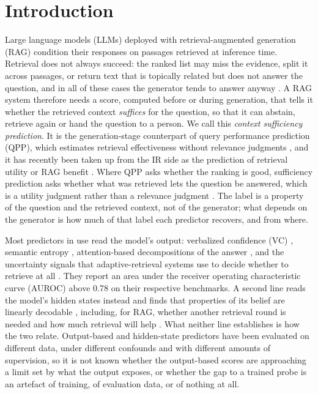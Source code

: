 \documentclass[acmsmall,screen,review]{acmart}
\begin{document}
\maketitle

\section{Introduction}
\label{sec:introduction}

Large language models (LLMs) deployed with retrieval-augmented generation (RAG) \citep{lewis2020rag} condition their responses on passages retrieved at inference time. Retrieval does not always succeed: the ranked list may miss the evidence, split it across passages, or return text that is topically related but does not answer the question, and in all of these cases the generator tends to answer anyway \citep{joren2025sufficient,cuconasu2024power}. A RAG system therefore needs a score, computed before or during generation, that tells it whether the retrieved context \emph{suffices} for the question, so that it can abstain, retrieve again or hand the question to a person. We call this \emph{context sufficiency prediction}. It is the generation-stage counterpart of query performance prediction (QPP), which estimates retrieval effectiveness without relevance judgments \citep{cronentownsend2002predicting,shtok2012predicting,carmel2010estimating}, and it has recently been taken up from the IR side as the prediction of retrieval utility or RAG benefit \citep{tian2026predicting,sinha2026adaptive,dado2026benefit}. Where QPP asks whether the ranking is good, sufficiency prediction asks whether what was retrieved lets the question be answered, which is a utility judgment rather than a relevance judgment \citep{zhang2024utility}. The label is a property of the question and the retrieved context, not of the generator; what depends on the generator is how much of that label each predictor recovers, and from where.

Most predictors in use read the model's output: verbalized confidence (VC) \citep{xiong2024llms,kadavath2022language}, semantic entropy \citep{farquhar2024semantic}, attention-based decompositions of the answer \citep{sun2025redeep}, and the uncertainty signals that adaptive-retrieval systems use to decide whether to retrieve at all \citep{jiang2023active,su2024dragin,moskvoretskii2025adaptive}. They report an area under the receiver operating characteristic curve (AUROC) above 0.78 on their respective benchmarks. A second line reads the model's hidden states instead and finds that properties of its belief are linearly decodable \citep{azaria2023internal,marks2024geometry}, including, for RAG, whether another retrieval round is needed \citep{baek2025probingrad,niu2026uarag,yao2025seakr,liu2025ctrla} and how much retrieval will help \citep{dado2026benefit}. What neither line establishes is how the two relate. Output-based and hidden-state predictors have been evaluated on different data, under different confounds and with different amounts of supervision, so it is not known whether the output-based scores are approaching a limit set by what the output exposes, or whether the gap to a trained probe is an artefact of training, of evaluation data, or of nothing at all.
\end{document}
